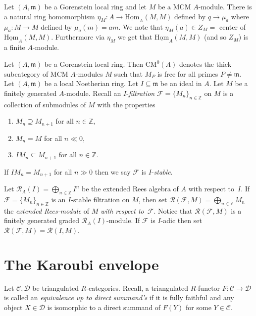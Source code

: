 \documentclass{amsart}
\newcommand{\wrt}{with respect to}
\newcommand{\D}{\mathcal{D} }
\newcommand{\m}{\mathfrak{m} }
\newcommand{\Z}{\mathbb{Z} }
\newcommand{\eR}{\mathcal{R} }
\newcommand{\Fc}{\mathcal{F} }
\newcommand{\C}{\mathcal{C}}
\newcommand{\rt}{\rightarrow}
\newcommand{\CMS}{\operatorname{\underline{CM}}}
\newcommand{\sHom}{\operatorname{\underline{Hom}}}
\theoremstyle{plain}
\theoremstyle{definition}
\theoremstyle{remark}
\begin{document}
{\s \label{center-eta} Let $(A,\m)$ be a Gorenstein local ring and let $M$ be a MCM $A$-module. There is a natural ring homomorphism $\eta_M \colon A \rt \sHom_A(M,M)$ defined by $q \rt \mu_a $ where $\mu_a \colon M \rt M$ defined by $\mu_a(m) = am$. We note that $\eta_M(a) \in Z_M = $ center of $\sHom_A(M,M)$. Furthermore via $\eta_M$ we get that $\sHom_A(M,M)$ (and so $Z_M$) is a finite $A$-module.

\s Let $(A, \m)$ be a Gorenstein local ring. Then $\CMS^0(A)$ denotes the thick subcategory of MCM $A$-modules $M$ such that $M_P$ is free for all primes  $P \neq \m$.
\s Let $(A,\m)$ be a local Noetherian ring. Let $I \subseteq \m$ be an ideal in $A$.
Let $M$ be a finitely generated $A$-module.
Recall an $I$-\textit{filtration} $\Fc = {\{M_n\}}_{n \in \Z}$ on $M$ is a
collection of submodules of $M$ with the properties
\begin{enumerate}
\item
$M_n \supseteq M_{n+1}$ for all $n \in \Z$,
\item
$M_n = M$ for all $n \ll 0$,
\item
$I M_n \subseteq M_{n+1}$ for all $n \in \Z$.
\end{enumerate}
If
$I M_n = M_{n+1}$ for all $n \gg 0$ then we say $\Fc$ is $I$-\emph{stable}.



Let $\eR_A(I) = \bigoplus_{n\in \Z} I^n$ be the extended Rees algebra of $A$ \wrt \ $I$.
If $\Fc = \{M_n\}_{n \in \Z}$ is an $I$-stable filtration on $M$, then  set
$\eR(\Fc ,M) = \bigoplus_{n \in \Z}M_n$ the \emph{extended Rees-module} of $M$
\emph{\wrt }\ $\Fc$.
 Notice that $\eR(\Fc,M)$ is a finitely generated graded $\eR_A(I)$-module. If $\Fc$ is $I$-adic then set $\eR(\Fc,M) = \eR(I, M)$.

\section{The Karoubi envelope}

Let $\C, \D$ be triangulated $R$-categories.
\s
Recall, a triangulated $R$-functor $F\colon \C\rt \D$ is called an \emph{equivalence up to direct summand's}
if it is fully faithful and any object $X \in \D$  is isomorphic to a direct summand of $F(Y)$ for
some $Y \in \C$.

}
\end{document}
